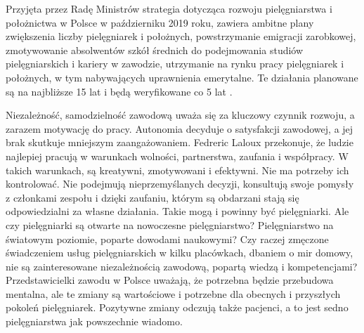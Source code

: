 \documentclass[a4paper,12pt,twoside,openany]{report}
\begin{document}
Przyjęta przez Radę Ministrów strategia dotycząca rozwoju pielęgniarstwa i położnictwa w Polsce   w październiku 2019 roku, zawiera ambitne plany zwiększenia liczby pielęgniarek i położnych, powstrzymanie emigracji zarobkowej, zmotywowanie absolwentów szkół średnich do podejmowania studiów pielęgniarskich i kariery w zawodzie, utrzymanie na rynku pracy pielęgniarek i położnych, w tym nabywających uprawnienia emerytalne. Te działania planowane są na najbliższe 15 lat i będą weryfikowane co 5 lat \cite{strategia}.

Niezależność, samodzielność zawodową uważa się za kluczowy czynnik rozwoju, a zarazem motywację do pracy. Autonomia decyduje o satysfakcji zawodowej, a jej brak skutkuje mniejszym zaangażowaniem. Fedreric Laloux przekonuje, że ludzie najlepiej pracują w warunkach wolności, partnerstwa, zaufania i współpracy. W takich warunkach, są kreatywni, zmotywowani i efektywni. Nie ma potrzeby ich kontrolować. Nie podejmują nieprzemyślanych decyzji, konsultują swoje pomysły z członkami zespołu i dzięki zaufaniu, którym są obdarzani stają się odpowiedzialni za własne działania. \cite{federic} Takie mogą i powinny być pielęgniarki. Ale czy pielęgniarki są otwarte na nowoczesne pielęgniarstwo? Pielęgniarstwo na światowym poziomie, poparte dowodami naukowymi? Czy raczej zmęczone świadczeniem usług pielęgniarskich w kilku placówkach, dbaniem o mir domowy, nie są zainteresowane niezależnością zawodową, popartą wiedzą i kompetencjami? Przedstawicielki zawodu w Polsce uważają, że potrzebna będzie przebudowa mentalna, ale te zmiany są wartościowe i potrzebne dla obecnych i przyszłych pokoleń pielęgniarek. Pozytywne zmiany odczują także pacjenci, a to jest sedno pielęgniarstwa jak powszechnie wiadomo.

\end{document}
